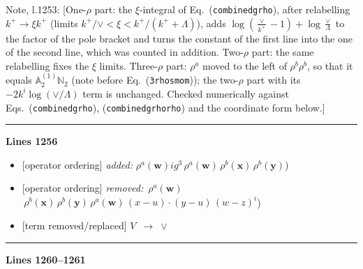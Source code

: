 \documentclass[10pt]{article}
\newenvironment{notebox}{\def\FrameCommand{{\color{notebar}\vrule width 1.5pt}\hspace{6pt}}\MakeFramed{\advance\hsize-\width\FrameRestore}\small}{\endMakeFramed}
\def\mf#1{\mathbb{#1}}
\begin{document}
\begin{notebox}\textsf{\small Note, l.1253:} [One-$\rho$ part: the $\xi$-integral of Eq.~(\texttt{combinedgrho}), after relabelling $k^+\to\xi k^+$ (limits $k^+/\vee<\xi<k^+/(k^++\Lambda)$), adds $\log(\frac{\vee}{k^+}-1)+\log\frac{\vee}{\Lambda}$ to the factor of the pole bracket and turns the constant of the first line into the one of the second line, which was counted in addition. Two-$\rho$ part: the same relabelling fixes the $\xi$ limits. Three-$\rho$ part: $\rho^a$ moved to the left of $\rho^b\rho^b$, so that it equals $\mf{A}^{(1)}_2\mf{N}_2$ (note before Eq.~(\texttt{3rhosmom})); the two-$\rho$ part with its $-2k^i\log(\vee/\Lambda)$ term is unchanged. Checked numerically against Eqs.~(\texttt{combinedgrho}), (\texttt{combinedgrhorho}) and the coordinate form below.]\end{notebox}
\noindent\rule{\linewidth}{0.3pt}\par\noindent\textbf{Lines 1256} \par
\begin{itemize}[leftmargin=2.2em,itemsep=1pt,topsep=2pt]
\item[\textbf{l.1256}] \textsf{\small [operator ordering]} \emph{added:} $\displaystyle \rho^{a}(\mathbf{w})$$\displaystyle ig^{3}\,\rho^{a}(\mathbf{w})\,\rho^{b}(\mathbf{x})\,\rho^{b}(\mathbf{y})${\color{gray}\small)}
\item[\textbf{l.1256}] \textsf{\small [operator ordering]} \emph{removed:} $\displaystyle \,\rho^{a}(\mathbf{w})$$\displaystyle \,\rho^{b}(\mathbf{x})\,\rho^{b}(\mathbf{y})\,\rho^{a}(\mathbf{w})\, (x-u)\cdot (y-u)\,(w-z)^{i}${\color{gray}\small)}
\item[\textbf{l.1256}] \textsf{\small [term removed/replaced]} $\displaystyle V$\ $\longrightarrow$\ $\displaystyle \vee$
\end{itemize}
\noindent\rule{\linewidth}{0.3pt}\par\noindent\textbf{Lines 1260--1261} \par
\end{document}

